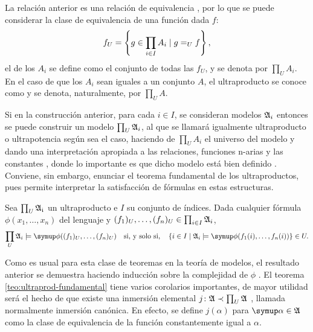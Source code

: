 \documentclass
[
  12pt,
  letterpaper,
  openany,
  oneside,
]{book}
\begin{document}
La relación anterior es una relación de equivalencia \autocite[Proposición 4.1.5]{chang_model_2012},
por lo que se puede considerar la clase de equivalencia de una función dada $f$:
\[
    f_U = \left\{ g\in \prod_{i\in I} A_i\mid g=_U f \right\},
\]
el  de los $A_i$ se define como el conjunto de todas las $f_U$,
y se denota por $\prod_U A_i$. En el caso de que los $A_i$ sean iguales
a un conjunto $A$, el ultraproducto se conoce como  y se denota, naturalmente,
por $\prod_U A$.

Si en la construcción anterior, para cada $i\in I$, se consideran modelos $\mathfrak { A }_i$ entonces
se puede construir un modelo $\prod_U \mathfrak { A }_i$, al que se llamará igualmente
ultraproducto o ultrapotencia según sea el caso,
haciendo de $\prod_U A_i$ el universo del modelo y dando una
interpretación apropiada a las relaciones,
funciones n-arias y las constantes \autocite[Definición 4.1.6]{chang_model_2012}, donde lo importante es que
dicho modelo está bien definido \autocite[Proposición 4.1.7]{chang_model_2012}. Conviene, sin embargo, enunciar el teorema fundamental de los
ultraproductos, pues permite interpretar la satisfacción de fórmulas
en estas estructuras.
\begin{teo}\label{teo:ultraprod-fundamental}
    Sea $\prod_U \mathfrak { A_i }$ un ultraproducto e $I$ su conjunto de índices.
    Dada cualquier fórmula $\phi(x_1,\dots,x_n)$ del lenguaje y $(f_1)_U,\dots,(f_n)_U\in\prod_{i\in I} \mathfrak { A }_i$,
    \[
        \prod_U \model{A}_i\models\phi((f_1)_U,\dots,(f_n)_U)
        \quad\text{si, y solo si,}\quad
        \set{i\in I\mid \model{A}_i\models\phi(f_1(i),\dots,f_n(i))}\in U.
    \]
\end{teo}

Como es usual para esta clase de teoremas en la teoría de modelos,
el resultado anterior se demuestra haciendo inducción sobre la complejidad
de $\phi$ \autocite[Teorema 4.1.9]{chang_model_2012}.
El teorema \ref{teo:ultraprod-fundamental} tiene varios corolarios importantes, de mayor
utilidad será el hecho de que existe una inmersión elemental
$j\colon \mathfrak { A }\prec\prod_U\mathfrak { A }$ \autocite[Corolario 4.1.13]{chang_model_2012},
llamada normalmente inmersión canónica.
En efecto, se define $j(\alpha)$
para $\alpha\in\model{A}$ como la clase de equivalencia de la función constantemente
igual a $\alpha$.
\end{document}
